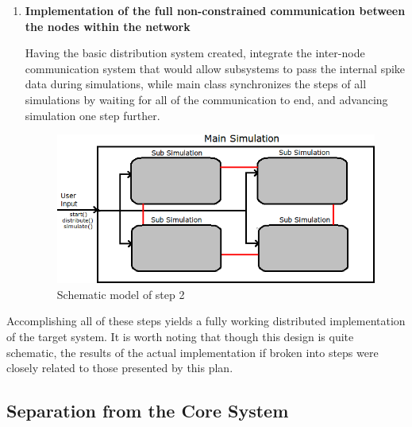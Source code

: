 \begin{enumerate}
\item{\textbf{Implementation of the full non-constrained communication between the nodes within the network}}

Having the basic distribution system created, integrate the inter-node communication system that would allow subsystems to pass the internal spike data during simulations, while main class synchronizes the steps of all simulations by
waiting for all of the communication to end, and advancing simulation one step further.

\begin{figure}[h]
\begin{center}
\includegraphics[scale = 0.25]{images/design_stage_3.png}
\end{center}
\caption{Schematic model of step 2}
\end{figure}

\end{enumerate}

Accomplishing all of these steps yields a fully working distributed implementation of the target system. It is worth noting that though this design is quite schematic, the results of the actual implementation if broken into steps were closely related to those presented by this plan.

\subsection{Separation from the Core System}

